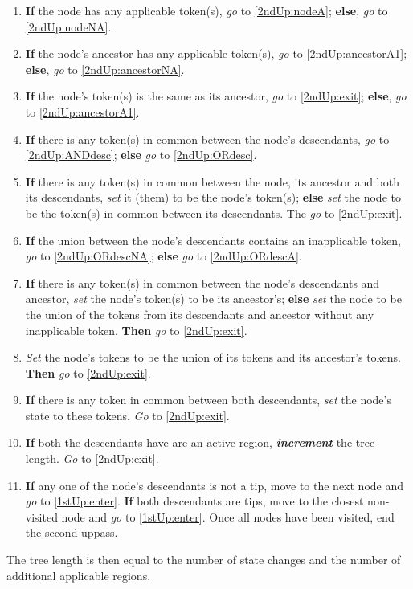 \documentclass[a4paper,12pt]{article}
\begin{document}
\begin{enumerate}
    \item \label{2ndUp:enter} \textbf{If} the node has any applicable token(s), \textit{go} to \ref{2ndUp:nodeA}; \textbf{else}, \textit{go} to \ref{2ndUp:nodeNA}.
    \item \label{2ndUp:nodeA} \textbf{If} the node's ancestor has any applicable token(s), \textit{go} to \ref{2ndUp:ancestorA1}; \textbf{else}, \textit{go} to \ref{2ndUp:ancestorNA}.
    \item \label{2ndUp:ancestorA1} \textbf{If} the node's token(s) is the same as its ancestor, \textit{go} to \ref{2ndUp:exit}; \textbf{else}, \textit{go} to \ref{2ndUp:ancestorA1}.
    \item \label{2ndUp:ancestorA2} \textbf{If} there is any token(s) in common between the node's descendants, \textit{go} to \ref{2ndUp:ANDdesc}; \textbf{else} \textit{go} to \ref{2ndUp:ORdesc}.
    \item \label{2ndUp:ANDdesc} \textbf{If} there is any token(s) in common between the node, its ancestor and both its descendants, \textit{set} it (them) to be the node's token(s); \textbf{else} \textit{set} the node to be the token(s) in common between its descendants. The \textit{go} to \ref{2ndUp:exit}.
    \item \label{2ndUp:ORdesc} \textbf{If} the union between the node's descendants contains an inapplicable token, \textit{go} to \ref{2ndUp:ORdescNA}; \textbf{else} \textit{go} to \ref{2ndUp:ORdescA}.
    \item \label{2ndUp:ORdescNA} \textbf{If} there is any token(s) in common between the node's descendants and ancestor, \textit{set} the node's token(s) to be its ancestor's; \textbf{else} \textit{set} the node to be the union of the tokens from its descendants and ancestor without any inapplicable token. \textbf{Then} \textit{go} to \ref{2ndUp:exit}.
    \item \label{2ndUp:ORdescA} \textit{Set} the node's tokens to be the union of its tokens and its ancestor's tokens. \textbf{Then} \textit{go} to \ref{2ndUp:exit}.
    \item \label{2ndUp:ancestorNA} \textbf{If} there is any token in common between both descendants, \textit{set} the node's state to these tokens. \textit{Go} to \ref{2ndUp:exit}. %
    \item \label{2ndUp:nodeNA} \textbf{If} both the descendants have are an active region, \textbf{\textit{increment}} the tree length. \textit{Go} to \ref{2ndUp:exit}. %
    \item \label{2ndUp:exit} \textbf{If} any one of the node's descendants is not a tip, move to the next node and \textit{go} to \ref{1stUp:enter}. \textbf{If} both descendants are tips, move to the closest non-visited node and \textit{go} to \ref{1stUp:enter}. Once all nodes have been visited, end the second uppass.
\end{enumerate}

The tree length is then equal to the number of state changes and the number of additional applicable regions.
\end{document}
